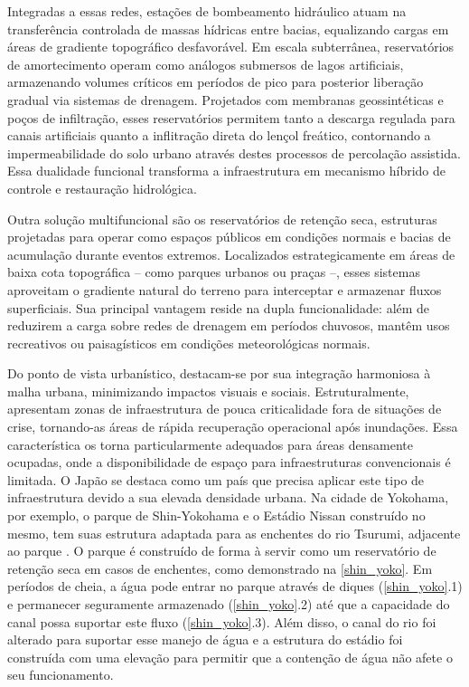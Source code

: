 
Integradas a essas redes, estações de bombeamento hidráulico atuam na transferência controlada de massas hídricas entre
bacias, equalizando cargas em áreas de gradiente topográfico desfavorável. Em escala subterrânea, reservatórios de
amortecimento operam como análogos submersos de lagos artificiais, armazenando volumes críticos em períodos de pico para
posterior liberação gradual via sistemas de drenagem. Projetados com membranas geossintéticas e poços de infiltração,
esses reservatórios permitem tanto a descarga regulada para canais artificiais quanto a inflitração direta do lençol
freático, contornando a impermeabilidade do solo urbano através destes processos de percolação assistida. Essa dualidade
funcional transforma a infraestrutura em mecanismo híbrido de controle e restauração hidrológica.

Outra solução multifuncional são os reservatórios de retenção seca, estruturas projetadas para operar como espaços
públicos em condições normais e bacias de acumulação durante eventos extremos. Localizados estrategicamente em áreas de
baixa cota topográfica – como parques urbanos ou praças –, esses sistemas aproveitam o gradiente natural do terreno para
interceptar e armazenar fluxos superficiais. Sua principal vantagem reside na dupla funcionalidade: além de reduzirem a
carga sobre redes de drenagem em períodos chuvosos, mantêm usos recreativos ou paisagísticos em condições meteorológicas
normais.

Do ponto de vista urbanístico, destacam-se por sua integração harmoniosa à malha urbana, minimizando impactos visuais e
sociais. Estruturalmente, apresentam zonas de infraestrutura de pouca criticalidade fora de situações de crise,
tornando-as áreas de rápida recuperação operacional após inundações. Essa característica os torna particularmente
adequados para áreas densamente ocupadas, onde a disponibilidade de espaço para infraestruturas convencionais é
limitada. O Japão se destaca como um país que precisa aplicar este tipo de infraestrutura devido a sua elevada densidade
urbana. Na cidade de Yokohama, por exemplo, o parque de Shin-Yokohama e o Estádio Nissan construído no mesmo, tem suas
estrutura adaptada para as enchentes do rio Tsurumi, adjacente ao parque \cite{shinyokohamaplan}. O parque é construído
de forma à servir como um reservatório de retenção seca em casos de enchentes, como demonstrado na \autoref{shin_yoko}.
Em períodos de cheia, a água pode entrar no parque através de diques (\autoref{shin_yoko}.1) e permanecer seguramente
armazenado (\autoref{shin_yoko}.2) até que a capacidade do canal possa suportar este fluxo (\autoref{shin_yoko}.3). Além
disso, o canal do rio foi alterado para suportar esse manejo de água e a estrutura do estádio foi construída com uma
elevação para permitir que a contenção de água não afete o seu funcionamento.


